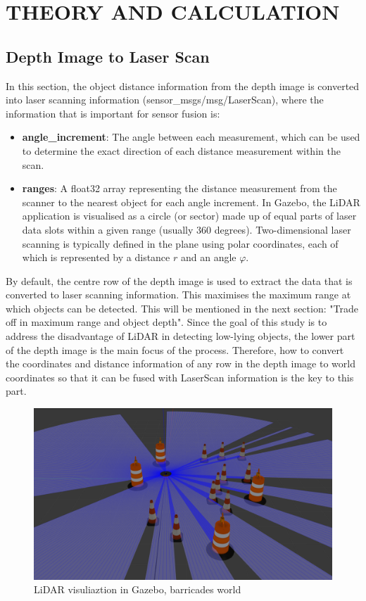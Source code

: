 \section{THEORY AND CALCULATION}
\label{sec:theory_and_calculation}
\subsection{Depth Image to Laser Scan}
In this section, the object distance information from the depth image is converted into laser scanning information (sensor\_msgs/msg/LaserScan), 
where the information that is important for sensor fusion is:
\begin{itemize}[leftmargin=*, itemsep=-1em, topsep=0em]
    \item \textbf{angle\_increment}: The angle between each measurement, 
    which can be used to determine the exact direction of each distance measurement within the scan. 
    \item \textbf{ranges}: A float32 array representing the distance measurement from the scanner to the nearest object for each angle increment. 
    In Gazebo, the LiDAR application is visualised as a circle (or sector) made up of equal parts of laser data slots within a given range (usually $360$ degrees). 
    Two-dimensional laser scanning is typically defined in the plane using polar coordinates, each of which is represented by a distance $r$ and an angle $\varphi$.
\end{itemize}
By default, the centre row of the depth image is used to extract the data that is converted to laser scanning information. 
This maximises the maximum range at which objects can be detected. 
This will be mentioned in the next section: "Trade off in maximum range and object depth". 
Since the goal of this study is to address the disadvantage of LiDAR in detecting low-lying objects, 
the lower part of the depth image is the main focus of the process. 
Therefore, how to convert the coordinates and distance information of any row in the depth image to world coordinates 
so that it can be fused with LaserScan information is the key to this part.

\begin{figure}[H]
    \centering
    \includegraphics[width=0.7\linewidth]{figs/gazebo_lidar.png}
    \caption{LiDAR visuliaztion in Gazebo, barricades world}
\end{figure}

